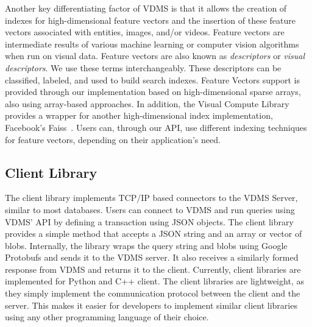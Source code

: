 Another key differentiating factor of VDMS is that it allows the creation of
indexes for high-dimensional feature vectors and the insertion of
these feature vectors associated with entities, images, and/or videos.
Feature vectors are intermediate results of various machine
learning or computer vision algorithms when run on visual data.
Feature vectors are also known as \textit{descriptors}
or \textit{visual descriptors}.
We use these terms interchangeably.
These descriptors can be classified, labeled, and used to build search indexes.
Feature Vectors support is provided through our implementation based
on high-dimensional sparse arrays, also using array-based approaches.
In addition, the Visual Compute Library provides a wrapper
for another high-dimensional index implementation,
Facebook's Faiss~\cite{faiss}.
Users can, through our API, use different indexing techniques
for feature vectors, depending on their application's need.


\subsection{Client Library}

The client library implements TCP/IP based connectors to the VDMS Server,
similar to most databases\cite{memsql, mysql, postgresql}.
Users can connect to VDMS and run queries using VDMS' API
by defining a transaction using JSON objects.
The client library provides a simple method that
accepts a JSON string and an array or vector of blobs.
Internally, the library wraps the query string and blobs using
Google Protobufs \cite{protobufs} and sends it to the VDMS server.
It also receives a similarly formed response from VDMS
and returns it to the client.
Currently, client libraries are implemented for Python and C++ client.
The client libraries are lightweight, as they simply implement the communication
protocol between the client and the server.
This makes it easier for developers to implement similar client libraries using
any other programming language of their choice.
